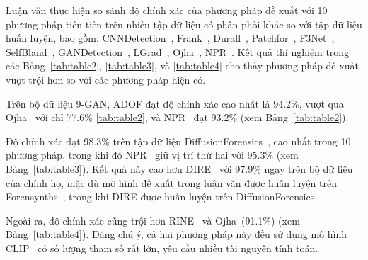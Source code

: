 %
Luận văn thực hiện so sánh độ chính xác của phương pháp đề xuất với 10 phương pháp tiên tiến trên nhiều tập dữ liệu có phân phối khác so với tập dữ liệu huấn luyện, bao gồm: 
CNNDetection~\cite{Wang2019CNNGeneratedIA}, 
Frank~\cite{Frank2020LeveragingFA}, 
Durall~\cite{Durall2020WatchYU}, 
Patchfor~\cite{Chai2020WhatMF}, 
F3Net~\cite{Qian2020ThinkingIF}, 
SelfBland~\cite{Shiohara2022DetectingDW}, 
GANDetection~\cite{Mandelli2022DetectingGI}, 
LGrad~\cite{Tan2023LearningOG}, 
Ojha~\cite{Ojha2023TowardsUF}, 
NPR~\cite{Tan2023RethinkingTU}. 
Kết quả thí nghiệm trong các Bảng~\ref{tab:table2}, \ref{tab:table3}, và \ref{tab:table4} cho thấy phương pháp đề xuất vượt trội hơn so với các phương pháp hiện có. 

Trên bộ dữ liệu 9-GAN, ADOF đạt độ chính xác cao nhất là 94.2\%, vượt qua Ojha~\cite{Ojha2023TowardsUF} với chỉ 77.6\% \ref{tab:table2}, và NPR~\cite{Tan2023RethinkingTU} đạt 93.2\% (xem Bảng~\ref{tab:table2}).

Độ chính xác đạt 98.3\% trên tập dữ liệu DiffusionForensics~\cite{Wang2023DIREFD}, cao nhất trong 10 phương pháp, trong khi đó NPR~\cite{Tan2023RethinkingTU} giữ vị trí thứ hai với 95.3\% (xem Bảng~\ref{tab:table3}). Kết quả này cao hơn DIRE~\cite{Wang2023DIREFD} với 97.9\% ngay trên bộ dữ liệu của chính họ, mặc dù mô hình đề xuất trong luận văn được huấn luyện trên Forensynths~\cite{Krizhevsky2012ImageNetCW}, trong khi DIRE được huấn luyện trên DiffusionForensics.

Ngoài ra, độ chính xác cũng trội hơn RINE~\cite{koutlis2024leveraging} và Ojha~\cite{Ojha2023TowardsUF}(91.1\%) (xem Bảng~\ref{tab:table4}). Đáng chú ý, cả hai phương pháp này đều sử dụng mô hình CLIP~\cite{abs-2103-00020} có số lượng tham số rất lớn, yêu cầu nhiều tài nguyên tính toán.






